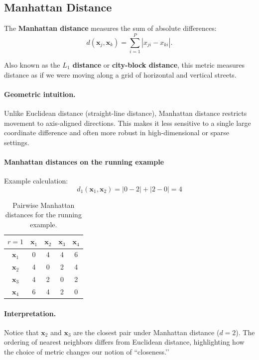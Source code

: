 \documentclass{article}
\begin{document}
\subsection{Manhattan Distance}

The \textbf{Manhattan distance} measures the sum of absolute differences:
\[
d(\mathbf{x}_j,\mathbf{x}_k)=\sum_{i=1}^{P}|x_{ji}-x_{ki}|.
\]

Also known as the \textbf{$L_1$ distance} or \textbf{city-block distance}, 
this metric measures distance as if we were moving along a grid of 
horizontal and vertical streets.

\paragraph{Geometric intuition.}
Unlike Euclidean distance (straight-line distance), Manhattan distance
restricts movement to axis-aligned directions.  
This makes it less sensitive to a single large coordinate difference and
often more robust in high-dimensional or sparse settings.

\paragraph{Manhattan distances on the running example}

Example calculation:
\[
d_1(\mathbf{x}_1,\mathbf{x}_2)=|0-2|+|2-0|=4
\]

\begin{table}[H]
\centering
\begin{tabular}{c|cccc}
\hline
$r=1$ & $\mathbf{x}_1$ & $\mathbf{x}_2$ & $\mathbf{x}_3$ & $\mathbf{x}_4$\\
\hline
$\mathbf{x}_1$ & 0 & 4 & 4 & 6\\
$\mathbf{x}_2$ & 4 & 0 & 2 & 4\\
$\mathbf{x}_3$ & 4 & 2 & 0 & 2\\
$\mathbf{x}_4$ & 6 & 4 & 2 & 0\\
\hline
\end{tabular}
\caption{Pairwise Manhattan distances for the running example.}
\end{table}

\paragraph{Interpretation.}
Notice that $\mathbf{x}_2$ and $\mathbf{x}_3$ are the closest pair under
Manhattan distance ($d=2$).  
The ordering of nearest neighbors differs from Euclidean distance,
highlighting how the choice of metric changes our notion of
“closeness.’’
\end{document}

